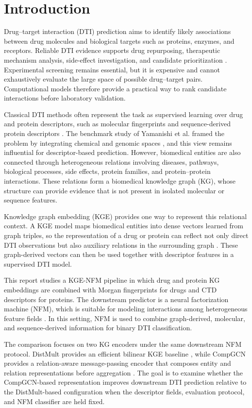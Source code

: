 \section{Introduction}
\label{sec:introduction}

Drug--target interaction (DTI) prediction aims to identify likely associations between drug molecules and biological targets such as proteins, enzymes, and receptors. Reliable DTI evidence supports drug repurposing, therapeutic mechanism analysis, side-effect investigation, and candidate prioritization \cite{ezzat2019computational}. Experimental screening remains essential, but it is expensive and cannot exhaustively evaluate the large space of possible drug--target pairs. Computational models therefore provide a practical way to rank candidate interactions before laboratory validation.

Classical DTI methods often represent the task as supervised learning over drug and protein descriptors, such as molecular fingerprints and sequence-derived protein descriptors \cite{rogers2010extended,dubchak1995prediction}. The benchmark study of Yamanishi et al. framed the problem by integrating chemical and genomic spaces \cite{yamanishi2008prediction}, and this view remains influential for descriptor-based prediction. However, biomedical entities are also connected through heterogeneous relations involving diseases, pathways, biological processes, side effects, protein families, and protein--protein interactions. These relations form a biomedical knowledge graph (KG), whose structure can provide evidence that is not present in isolated molecular or sequence features.

Knowledge graph embedding (KGE) provides one way to represent this relational context. A KGE model maps biomedical entities into dense vectors learned from graph triples, so the representation of a drug or protein can reflect not only direct DTI observations but also auxiliary relations in the surrounding graph \cite{bordes2013translating,YangYHGD14a}. These graph-derived vectors can then be used together with descriptor features in a supervised DTI model.

This report studies a KGE-NFM pipeline in which drug and protein KG embeddings are combined with Morgan fingerprints for drugs and CTD descriptors for proteins. The downstream predictor is a neural factorization machine (NFM), which is suitable for modeling interactions among heterogeneous feature fields \cite{0001C17,ye2021unified}. In this setting, NFM is used to combine graph-derived, molecular, and sequence-derived information for binary DTI classification.

The comparison focuses on two KG encoders under the same downstream NFM protocol. DistMult provides an efficient bilinear KGE baseline \cite{YangYHGD14a}, while CompGCN provides a relation-aware message-passing encoder that composes entity and relation representations before aggregation \cite{VashishthSNT20}. The goal is to examine whether the CompGCN-based representation improves downstream DTI prediction relative to the DistMult-based configuration when the descriptor fields, evaluation protocol, and NFM classifier are held fixed.
